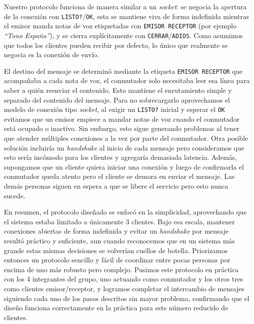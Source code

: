 \documentclass[11pt]{article}
\begin{document}
Nuestro protocolo funciona de manera similar a un \textit{socket}: se negocia la apertura de la conexión con \texttt{LISTO?}/\texttt{OK},
esta se mantiene viva de forma indefinida mientras el emisor manda notas de voz etiquetadas con \texttt{EMISOR \textbar{} RECEPTOR}
(por ejemplo \textit{``Tono \textbar{} España''}), y se cierra explícitamente con \texttt{CERRAR}/\texttt{ADIOS}. Como asumimos que
todos los clientes pueden recibir por defecto, lo único que realmente se negocia es la conexión de envío.

El destino del mensaje se determinó mediante la etiqueta \texttt{EMISOR \textbar{} RECEPTOR} que acompañaba a cada nota de voz, el
conmutador solo necesitaba leer esa línea para saber a quién reenviar el contenido. Esto mantiene el enrutamiento simple y separado del contenido del
mensaje. Para no sobrecargarlo aprovechamos el modelo de conexión tipo \textit{socket}, al exigir un \texttt{LISTO?} inicial y esperar
el \texttt{OK} evitamos que un emisor empiece a mandar notas de voz cuando el conmutador está ocupado o inactivo. Sin embargo, esto sigue generando
problemas al tener que atender múltiples conexiones a la vez por parte del conmutador. Otra posible solución incluiría un \textit{handshake} al inicio
de cada mensaje pero consideramos que esto sería incómodo para los clientes y agregaría demasiada latencia. Además, supongamos que un cliente
quiera iniciar una conexión y luego de confirmarla el conmutador queda atento pero el cliente se demora en enviar el mensaje. Las demás personas siguen en espera
a que se libere el servicio pero esto nunca sucede.

En resumen, el protocolo diseñado se enfocó en la simplicidad, aprovechando que el sistema estaba limitado a únicamente 3 clientes. Bajo esa escala,
mantener conexiones abiertas de forma indefinida y evitar un \textit{handshake} por mensaje resultó práctico y suficiente, aun cuando reconocemos
que en un sistema más grande estas mismas decisiones se volverían cuellos de botella. Priorizamos entonces un protocolo sencillo y fácil de coordinar
entre pocas personas por encima de uno más robusto pero complejo. Pusimos este protocolo en práctica con los 4 integrantes del grupo, uno actuando
como conmutador y los otros tres como clientes emisor/receptor, y logramos completar el intercambio de mensajes siguiendo cada uno de los pasos
descritos sin mayor problema, confirmando que el diseño funciona correctamente en la práctica para este número reducido de clientes.
\end{document}

